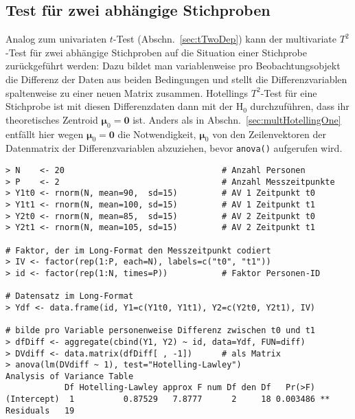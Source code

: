 \subsection{Test für zwei abhängige Stichproben}

Analog zum univariaten $t$-Test (Abschn.\ \ref{sec:tTwoDep}) kann der multivariate $T^{2}$-Test für zwei abhängige Stichproben auf die Situation einer Stichprobe zurückgeführt werden: Dazu bildet man variablenweise pro Beobachtungsobjekt die Differenz der Daten aus beiden Bedingungen und stellt die Differenzvariablen spaltenweise zu einer neuen Matrix zusammen. Hotellings $T^{2}$-Test für eine Stichprobe ist mit diesen Differenzdaten dann mit der $\text{H}_{0}$ durchzuführen, dass ihr theoretisches Zentroid $\bm{\mu}_0 = \bm{0}$ ist. Anders als in Abschn.\ \ref{sec:multHotellingOne} entfällt hier wegen $\bm{\mu}_0 = \bm{0}$ die Notwendigkeit, $\bm{\mu}_0$ von den Zeilenvektoren der Datenmatrix der Differenzvariablen abzuziehen, bevor \lstinline!anova()! aufgerufen wird.
\begin{lstlisting}
> N    <- 20                                # Anzahl Personen
> P    <- 2                                 # Anzahl Messzeitpunkte
> Y1t0 <- rnorm(N, mean=90,  sd=15)         # AV 1 Zeitpunkt t0
> Y1t1 <- rnorm(N, mean=100, sd=15)         # AV 1 Zeitpunkt t1
> Y2t0 <- rnorm(N, mean=85,  sd=15)         # AV 2 Zeitpunkt t0
> Y2t1 <- rnorm(N, mean=105, sd=15)         # AV 2 Zeitpunkt t1

# Faktor, der im Long-Format den Messzeitpunkt codiert
> IV <- factor(rep(1:P, each=N), labels=c("t0", "t1"))
> id <- factor(rep(1:N, times=P))           # Faktor Personen-ID

# Datensatz im Long-Format
> Ydf <- data.frame(id, Y1=c(Y1t0, Y1t1), Y2=c(Y2t0, Y2t1), IV)

# bilde pro Variable personenweise Differenz zwischen t0 und t1
> dfDiff <- aggregate(cbind(Y1, Y2) ~ id, data=Ydf, FUN=diff)
> DVdiff <- data.matrix(dfDiff[ , -1])      # als Matrix
> anova(lm(DVdiff ~ 1), test="Hotelling-Lawley")
Analysis of Variance Table
            Df Hotelling-Lawley approx F num Df den Df   Pr(>F)
(Intercept)  1          0.87529   7.8777      2     18 0.003486 **
Residuals   19
\end{lstlisting}

